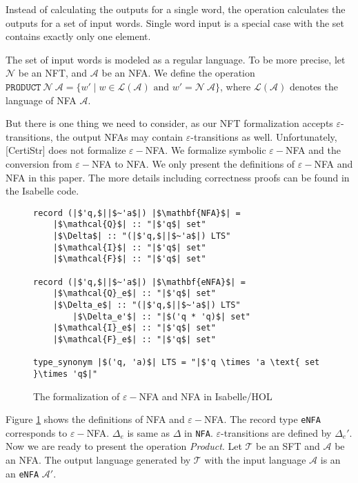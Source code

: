 \documentclass[a4paper,UKenglish,cleveref, autoref, thm-restate]{lipics-v2021}
\begin{document}
Instead of calculating the outputs for a single word, the operation calculates the outputs for a set of input words. Single word input is a special case with the set contains exactly only one element.

The set of input words is modeled as a regular language. To be more precise, let $\mathcal{N}$ be an NFT, and $\mathcal{A}$ be an NFA. We define the operation $\texttt{PRODUCT} ~\mathcal{N}~\mathcal{A} = \{w'\mid w\in \mathcal{L}(\mathcal{A})\text{ and } w' = \mathcal{N}~\mathcal{A}\}$, where $\mathcal{L}(\mathcal{A})$ denotes the language of NFA $\mathcal{A}$.


But there is one thing we need to consider, as our NFT formalization accepts $\varepsilon$-transitions, the output NFAs may contain $\varepsilon$-transitions as well. Unfortunately, [CertiStr] does not formalize $\varepsilon-$NFA. We formalize symbolic $\varepsilon-$NFA and the conversion from $\varepsilon-$NFA to NFA. We only present the definitions of $\varepsilon-$NFA and NFA in this paper. The more details including correctness proofs can be found in the Isabelle code. 

\begin{figure}[hbt!]
	\begin{lstlisting}
record (|$'q,$||$~'a$|) |$\mathbf{NFA}$| =
	|$\mathcal{Q}$| :: "|$'q$| set"
	|$\Delta$| :: "(|$'q,$||$~'a$|) LTS"
	|$\mathcal{I}$| :: "|$'q$| set"
	|$\mathcal{F}$| :: "|$'q$| set"

record (|$'q,$||$~'a$|) |$\mathbf{eNFA}$| =
	|$\mathcal{Q}_e$| :: "|$'q$| set"
	|$\Delta_e$| :: "(|$'q,$||$~'a$|) LTS"
        |$\Delta_e'$| :: "|$('q * 'q)$| set"
	|$\mathcal{I}_e$| :: "|$'q$| set"
	|$\mathcal{F}_e$| :: "|$'q$| set"

type_synonym |$('q, 'a)$| LTS = "|$'q \times 'a \text{ set }\times 'q$|"    
	\end{lstlisting}
\caption{The formalization of $\varepsilon-$NFA and NFA in Isabelle/HOL}
\label{fig-def-FAs}
\end{figure}

Figure \ref{fig-def-FAs} shows the definitions of NFA and $\varepsilon-$NFA.
The record type \texttt{eNFA} corresponds to $\varepsilon-$NFA. $\Delta_e$ is same as $\Delta$ in \texttt{NFA}. $\varepsilon$-transitions are defined by $\Delta_e'$.  Now we are ready to present the operation \emph{Product}. Let $\mathcal{T}$ be an SFT and  $\mathcal{A}$ be an NFA. The output language generated by $\mathcal{T}$ with the input language $\mathcal{A}$ is an an \texttt{eNFA} $\mathcal{A}'$. 
\end{document}
